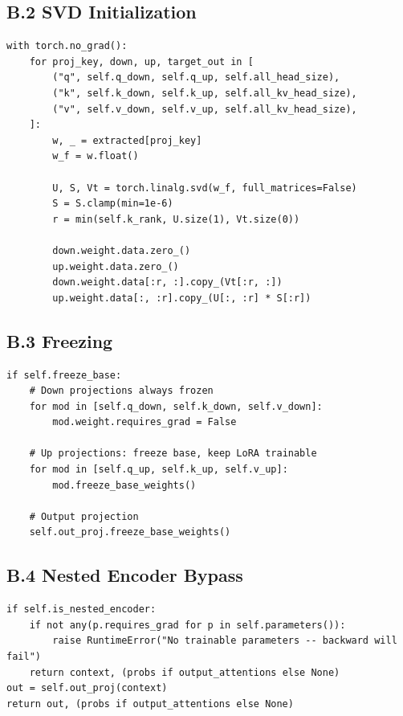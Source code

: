 \subsection{B.2 SVD Initialization}

\begin{lstlisting}
with torch.no_grad():
    for proj_key, down, up, target_out in [
        ("q", self.q_down, self.q_up, self.all_head_size),
        ("k", self.k_down, self.k_up, self.all_kv_head_size),
        ("v", self.v_down, self.v_up, self.all_kv_head_size),
    ]:
        w, _ = extracted[proj_key]
        w_f = w.float()
        
        U, S, Vt = torch.linalg.svd(w_f, full_matrices=False)
        S = S.clamp(min=1e-6)
        r = min(self.k_rank, U.size(1), Vt.size(0))
        
        down.weight.data.zero_()
        up.weight.data.zero_()
        down.weight.data[:r, :].copy_(Vt[:r, :])
        up.weight.data[:, :r].copy_(U[:, :r] * S[:r])
\end{lstlisting}

\subsection{B.3 Freezing}

\begin{lstlisting}
if self.freeze_base:
    # Down projections always frozen
    for mod in [self.q_down, self.k_down, self.v_down]:
        mod.weight.requires_grad = False
    
    # Up projections: freeze base, keep LoRA trainable
    for mod in [self.q_up, self.k_up, self.v_up]:
        mod.freeze_base_weights()
    
    # Output projection
    self.out_proj.freeze_base_weights()
\end{lstlisting}

\subsection{B.4 Nested Encoder Bypass}

\begin{lstlisting}
if self.is_nested_encoder:
    if not any(p.requires_grad for p in self.parameters()):
        raise RuntimeError("No trainable parameters -- backward will fail")
    return context, (probs if output_attentions else None)
out = self.out_proj(context)
return out, (probs if output_attentions else None)
\end{lstlisting}

